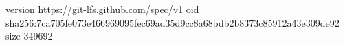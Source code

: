 version https://git-lfs.github.com/spec/v1
oid sha256:7ca705fe073e466969095fec69ad35d9cc8a68bdb2b8373c85912a43e309de92
size 349692
